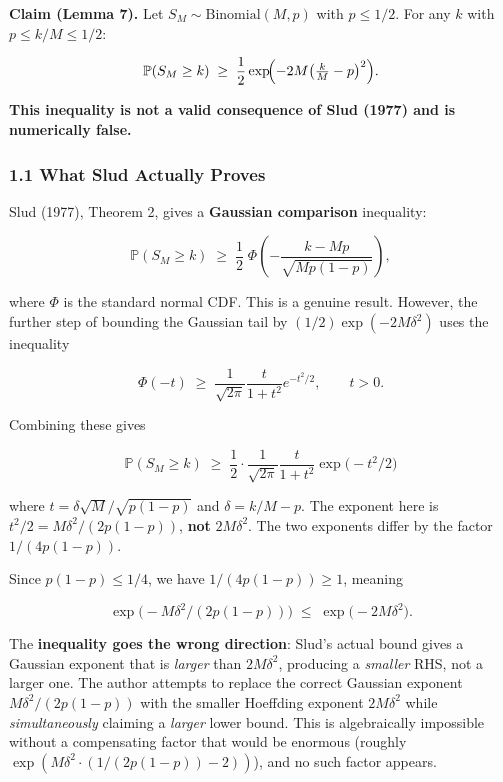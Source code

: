 \documentclass[
  12pt,
]{ctexart}
\begin{document}
\textbf{Claim (Lemma 7).} Let \(S_M \sim \text{Binomial}(M,p)\) with
\(p \leq 1/2\). For any \(k\) with \(p \leq k/M \leq 1/2\):

\[\mathbb{P}(S_M \geq k) \;\geq\; \frac12 \exp\!\Bigl(-2M\bigl(\tfrac{k}{M} - p\bigr)^2\Bigr).\]

\textbf{This inequality is not a valid consequence of Slud (1977) and is
numerically false.}

\subsubsection{1.1 What Slud Actually
Proves}\label{what-slud-actually-proves}

Slud (1977), Theorem 2, gives a \textbf{Gaussian comparison} inequality:

\[\mathbb{P}(S_M \geq k) \;\geq\; \frac12 \;\Phi\!\left(-\frac{k-Mp}{\sqrt{Mp(1-p)}}\right),\]

where \(\Phi\) is the standard normal CDF. This is a genuine result.
However, the further step of bounding the Gaussian tail by
\((1/2)\exp(-2M\delta^2)\) uses the inequality

\[\Phi(-t) \;\geq\; \frac{1}{\sqrt{2\pi}}\frac{t}{1+t^2}e^{-t^2/2}, \qquad t > 0.\]

Combining these gives

\[\mathbb{P}(S_M \geq k) \;\geq\; \frac12 \cdot \frac{1}{\sqrt{2\pi}}\frac{t}{1+t^2}\exp\!\bigl(-t^2/2\bigr)\]

where \(t = \delta\sqrt{M}/\sqrt{p(1-p)}\) and \(\delta = k/M - p\). The
exponent here is \(t^2/2 = M\delta^2/(2p(1-p))\), \textbf{not}
\(2M\delta^2\). The two exponents differ by the factor \(1/(4p(1-p))\).

Since \(p(1-p) \leq 1/4\), we have \(1/(4p(1-p)) \geq 1\), meaning

\[\exp\!\bigl(-M\delta^2/(2p(1-p))\bigr) \;\leq\; \exp\!\bigl(-2M\delta^2\bigr).\]

The \textbf{inequality goes the wrong direction}: Slud's actual bound
gives a Gaussian exponent that is \emph{larger} than \(2M\delta^2\),
producing a \emph{smaller} RHS, not a larger one. The author attempts to
replace the correct Gaussian exponent \(M\delta^2/(2p(1-p))\) with the
smaller Hoeffding exponent \(2M\delta^2\) while \emph{simultaneously}
claiming a \emph{larger} lower bound. This is algebraically impossible
without a compensating factor that would be enormous (roughly
\(\exp(M\delta^2\cdot(1/(2p(1-p))-2))\)), and no such factor appears.
\end{document}
